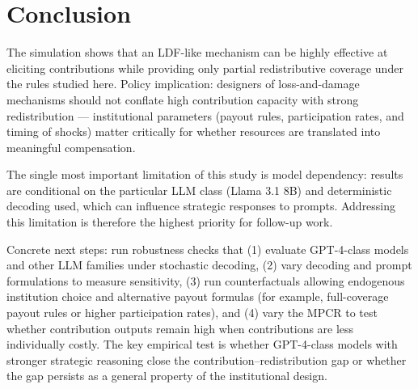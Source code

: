 \documentclass[12pt,letterpaper]{article}
\begin{document}
\section{Conclusion}

The simulation shows that an LDF-like mechanism can be highly effective at eliciting contributions while providing only partial redistributive coverage under the rules studied here. Policy implication: designers of loss-and-damage mechanisms should not conflate high contribution capacity with strong redistribution — institutional parameters (payout rules, participation rates, and timing of shocks) matter critically for whether resources are translated into meaningful compensation.

The single most important limitation of this study is model dependency: results are conditional on the particular LLM class (Llama 3.1 8B) and deterministic decoding used, which can influence strategic responses to prompts. Addressing this limitation is therefore the highest priority for follow-up work.

Concrete next steps: run robustness checks that (1) evaluate GPT-4-class models and other LLM families under stochastic decoding, (2) vary decoding and prompt formulations to measure sensitivity, (3) run counterfactuals allowing endogenous institution choice and alternative payout formulas (for example, full-coverage payout rules or higher participation rates), and (4) vary the MPCR to test whether contribution outputs remain high when contributions are less individually costly. The key empirical test is whether GPT-4-class models with stronger strategic reasoning close the contribution–redistribution gap or whether the gap persists as a general property of the institutional design.

\newpage
\end{document}

